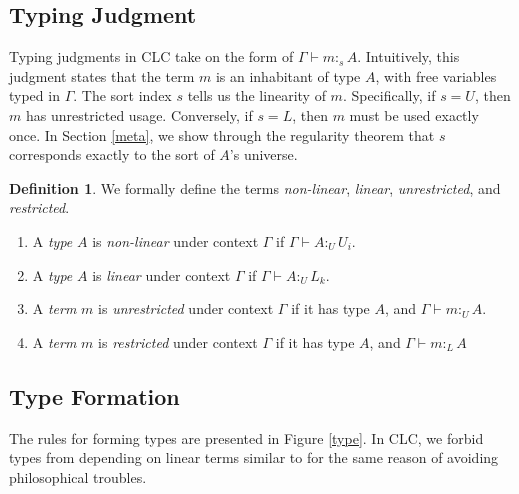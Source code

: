 \documentclass{article}
\theoremstyle{definition}
\newtheorem{definition}{Definition}[section]
\newcommand{\utype}{:_{\scriptscriptstyle U}}
\newcommand{\ltype}{:_{\scriptscriptstyle L}}
\newcommand{\stype}[1]{:_#1}
\begin{document}
  \subsection{Typing Judgment}
  Typing judgments in CLC take on the form of $\Gamma \vdash m \stype{s} A$. Intuitively, this judgment states that the term $m$ is an inhabitant of type $A$, with free variables typed in $\Gamma$. The sort index $s$ tells us the linearity of $m$. Specifically, if $s = U$, then $m$ has unrestricted usage. Conversely, if $s = L$, then $m$ must be used exactly once. In Section \ref{meta}, we show through the regularity theorem that $s$ corresponds exactly to the sort of $A$'s universe.

  \begin{definition} We formally define the terms \textit{non-linear}, \textit{linear}, \textit{unrestricted}, and \textit{restricted}.
    \begin{enumerate}
      \item A \textit{type} $A$ is \textit{non-linear} under context $\Gamma$ if $\Gamma \vdash A \utype U_i$.
      \item A \textit{type} $A$ is \textit{linear} under context $\Gamma$ if $\Gamma \vdash A \utype L_k$.
      \item A \textit{term} $m$ is \textit{unrestricted} under context $\Gamma$ if it has type $A$, and $\Gamma \vdash m \utype A$.
      \item A \textit{term} $m$ is \textit{restricted} under context $\Gamma$ if it has type $A$, and $\Gamma \vdash m \ltype A$
    \end{enumerate}
  \end{definition}

  \subsection{Type Formation} \label{tyformation}
  The rules for forming types are presented in Figure \ref{type}. In CLC, we forbid types from depending on linear terms similar to \cite{llf,neel15} for the same reason of avoiding philosophical troubles.
\end{document}
